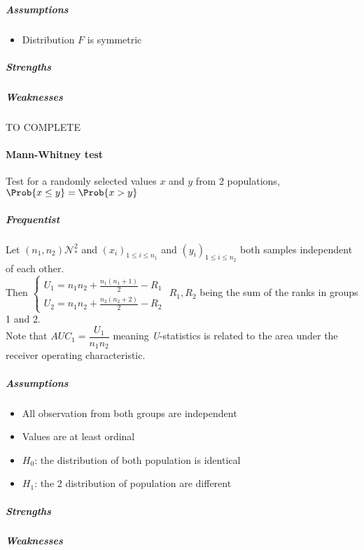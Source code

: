 \subparagraph{Assumptions}
\begin{itemize}
    \item Distribution $F$ is symmetric
\end{itemize}

\subparagraph{Strengths}
\subparagraph{Weaknesses}

TO COMPLETE

\paragraph{Mann-Whitney test}
Test for a randomly selected values $x$ and $y$ from 2 populations, $\Prob{x\leq y} = 
\Prob{x > y}$
\subparagraph{Frequentist}
Let $(n_{1}, n_{2})\mathcal{N}_{*}^{2}$ and $\left(x_{i}\right)_{1\leq i\leq n_{1}}$
and $\left(y_{i}\right)_{1\leq i\leq n_{2}}$ both samples independent of each other.\\
Then
$\begin{cases}
    U_{1} = n_{1}n_{2} + \frac{n_{1}(n_{1} + 1)}{2} - R_{1} \\
    U_{2} = n_{1}n_{2} + \frac{n_{2}(n_{2} + 2)}{2} - R_{2} 
\end{cases}$
$R_{1}, R_{2}$ being the sum of the ranks in groups 1 and 2. \\
Note that $AUC_{1}=\dfrac{U_{1}}{n_{1}n_{2}}$ meaning \emph{U}-statistics is related to
the area under the receiver operating characteristic.


\subparagraph{Assumptions}
\begin{itemize}
    \item All observation from both groups are independent
    \item Values are at least ordinal
    \item $H_{0}$: the distribution of both population is identical
    \item $H_{1}$: the 2 distribution of population are different
\end{itemize}

\subparagraph{Strengths}
\subparagraph{Weaknesses}

